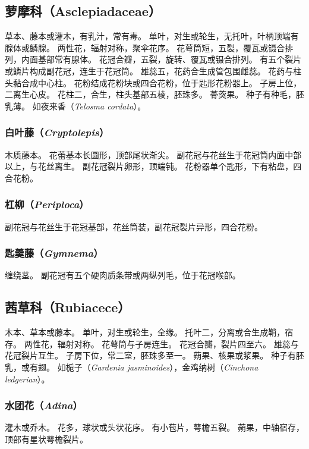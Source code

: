 \documentclass[11pt]{article}
\begin{document}
\begin{sloppypar}
\subsection{萝摩科（Asclepiadaceae）}
草本、藤本或灌木，有乳汁，常有毒。
单叶，对生或轮生，无托叶，叶柄顶端有腺体或鳞腺。
两性花，辐射对称，聚伞花序。
花萼筒短，五裂，覆瓦或镊合排列，内面基部常有腺体。
花冠合瓣，五裂，旋转、覆瓦或镊合排列。
有五个裂片或鳞片构成副花冠，连生于花冠筒。
雄蕊五，花药合生成管包围雌蕊。
花药与柱头黏合成中心柱。
花粉结成花粉块或四合花粉，位于匙形花粉器上。
子房上位，二离生心皮。
花柱二，合生，柱头基部五棱，胚珠多。
蓇葖果。
种子有种毛，胚乳薄。
如夜来香（\textit{Telosma cordata}）。

\subsubsection{白叶藤（\textit{Cryptolepis}）}
木质藤本。
花蕾基本长圆形，顶部尾状渐尖。
副花冠与花丝生于花冠筒内面中部以上，与花丝离生。
副花冠裂片卵形，顶端钝。
花粉器单个匙形，下有粘盘，四合花粉。

\subsubsection{杠柳（\textit{Periploca}）}
副花冠与花丝生于花冠基部，花丝筒装，副花冠裂片异形，四合花粉。

\subsubsection{匙羹藤（\textit{Gymnema}）}
缠绕茎。
副花冠有五个硬肉质条带或两纵列毛，位于花冠喉部。

\subsection{茜草科（Rubiacece）}
木本、草本或藤本。
单叶，对生或轮生，全缘。
托叶二，分离或合生成鞘，宿存。
两性花，辐射对称。
花萼筒与子房连生。
花冠合瓣，裂片四至六。
雄蕊与花冠裂片互生。
子房下位，常二室，胚珠多至一。
蒴果、核果或浆果。
种子有胚乳，或有翅。
如栀子（\textit{Gardenia jasminoides}），金鸡纳树（\textit{Cinchona ledgerian}）。

\subsubsection{水团花（\textit{Adina}）}
灌木或乔木。
花多，球状或头状花序。
有小苞片，萼檐五裂。
蒴果，中轴宿存，顶部有星状萼檐裂片。


\end{sloppypar}
\end{document}
